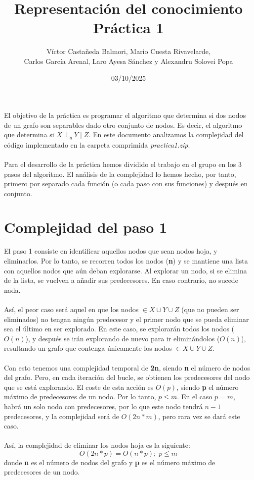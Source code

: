 \documentclass[a4paper,12pt]{article}
\title{Representación del conocimiento \\ Práctica 1}
\author{Víctor Castañeda Balmori, Mario Cuesta Rivavelarde, \\
Carlos García Arenal, Laro Ayesa Sánchez y Alexandru Solovei Popa}
\date{03/10/2025}
\begin{document}
\maketitle
\thispagestyle{fancy}
El objetivo de la práctica es programar el algoritmo que determina si dos nodos de un grafo son separables dado otro conjunto de nodos. Es decir, el algoritmo que determina si $X \perp _g Y \mid Z$. En este documento analizamos la complejidad del código implementado en la carpeta comprimida \textit{practica1.zip}. \\ \\
Para el desarrollo de la práctica hemos dividido el trabajo en el grupo en los 3 pasos del algoritmo. El análisis de la complejidad lo hemos hecho, por tanto, primero por separado cada función (o cada paso con sus funciones) y después en conjunto.

\section{Complejidad del paso 1}

El paso 1 consiste en identificar aquellos nodos que sean nodos hoja, y eliminarlos. Por lo tanto, se recorren todos los nodos (\textbf{n}) y se mantiene una lista con aquellos nodos que aún deban explorarse. Al explorar un nodo, si se elimina de la lista, se vuelven a añadir sus predecesores. En caso contrario, no sucede nada. \\ \\
Así, el peor caso será aquel en que los nodos $\in X \cup Y \cup Z$ (que no pueden ser eliminados) no tengan ningún predecesor y el primer nodo que se pueda eliminar sea el último en ser explorado. En este caso, se explorarán todos los nodos ($O(n)$), y después se irán explorando de nuevo para ir eliminándolos ($O(n)$), resultando un grafo que contenga únicamente los nodos $\in X \cup Y \cup Z$. \\ \\
Con esto tenemos una complejidad temporal de \textbf{2n}, siendo \textbf{n} el número de nodos del grafo. Pero, en cada iteración del bucle, se obtienen los predecesores del nodo que se está explorando. El coste de esta acción es $O(p)$, siendo \textbf{p} el número máximo de predecesores de un nodo. Por lo tanto, $p \le m$. En el caso $p = m$, habrá un solo nodo con predecesores, por lo que este nodo tendrá $n - 1$ predecesores, y la complejidad será de $O(2n*m)$, pero rara vez se dará este caso. \\ \\
Así, la complejidad de eliminar los nodos hoja es la siguiente:
$$O(2n*p) = O(n*p); \; p \le m$$
donde \textbf{n} es el número de nodos del grafo y \textbf{p} es el número máximo de predecesores de un nodo.
\end{document}
